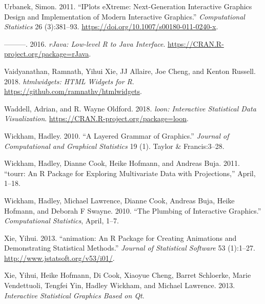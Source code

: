 \documentclass[12pt,]{article}
\theoremstyle{definition}
\theoremstyle{definition}
\theoremstyle{definition}
\theoremstyle{remark}
\begin{document}
\leavevmode\hypertarget{ref-Urbanek2011}{}%
Urbanek, Simon. 2011. ``IPlots eXtreme: Next-Generation Interactive
Graphics Design and Implementation of Modern Interactive Graphics.''
\emph{Computational Statistics} 26 (3):381--93.
\url{https://doi.org/10.1007/s00180-011-0240-x}.

\leavevmode\hypertarget{ref-rJava}{}%
---------. 2016. \emph{rJava: Low-level R to Java Interface}.
\url{https://CRAN.R-project.org/package=rJava}.

\leavevmode\hypertarget{ref-htmlwidgets}{}%
Vaidyanathan, Ramnath, Yihui Xie, JJ Allaire, Joe Cheng, and Kenton
Russell. 2018. \emph{htmlwidgets: HTML Widgets for R}.
\url{https://github.com/ramnathv/htmlwidgets}.

\leavevmode\hypertarget{ref-loon}{}%
Waddell, Adrian, and R. Wayne Oldford. 2018. \emph{loon: Interactive
Statistical Data Visualization}.
\url{https://CRAN.R-project.org/package=loon}.

\leavevmode\hypertarget{ref-ggplot2-paper}{}%
Wickham, Hadley. 2010. ``A Layered Grammar of Graphics.'' \emph{Journal
of Computational and Graphical Statistics} 19 (1). Taylor \&
Francis:3--28.

\leavevmode\hypertarget{ref-tourr}{}%
Wickham, Hadley, Dianne Cook, Heike Hofmann, and Andreas Buja. 2011.
``tourr: An R Package for Exploring Multivariate Data with
Projections,'' April, 1--18.

\leavevmode\hypertarget{ref-plumbing}{}%
Wickham, Hadley, Michael Lawrence, Dianne Cook, Andreas Buja, Heike
Hofmann, and Deborah F Swayne. 2010. ``The Plumbing of Interactive
Graphics.'' \emph{Computational Statistics}, April, 1--7.

\leavevmode\hypertarget{ref-animation}{}%
Xie, Yihui. 2013. ``animation: An R Package for Creating Animations and
Demonstrating Statistical Methods.'' \emph{Journal of Statistical
Software} 53 (1):1--27. \url{http://www.jstatsoft.org/v53/i01/}.

\leavevmode\hypertarget{ref-cranvas}{}%
Xie, Yihui, Heike Hofmann, Di Cook, Xiaoyue Cheng, Barret Schloerke,
Marie Vendettuoli, Tengfei Yin, Hadley Wickham, and Michael Lawrence.
2013. \emph{Interactive Statistical Graphics Based on Qt}.
\end{document}
